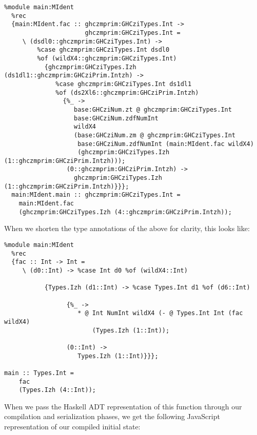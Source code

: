 \begin{verbatim}
%module main:MIdent
  %rec
  {main:MIdent.fac :: ghczmprim:GHCziTypes.Int ->
                      ghczmprim:GHCziTypes.Int =
     \ (dsdl0::ghczmprim:GHCziTypes.Int) ->
         %case ghczmprim:GHCziTypes.Int dsdl0
         %of (wildX4::ghczmprim:GHCziTypes.Int)
           {ghczmprim:GHCziTypes.Izh (ds1dl1::ghczmprim:GHCziPrim.Intzh) ->
              %case ghczmprim:GHCziTypes.Int ds1dl1
              %of (ds2Xl6::ghczmprim:GHCziPrim.Intzh)
                {%_ ->
                   base:GHCziNum.zt @ ghczmprim:GHCziTypes.Int 
                   base:GHCziNum.zdfNumInt
                   wildX4
                   (base:GHCziNum.zm @ ghczmprim:GHCziTypes.Int
                    base:GHCziNum.zdfNumInt (main:MIdent.fac wildX4)
                    (ghczmprim:GHCziTypes.Izh (1::ghczmprim:GHCziPrim.Intzh)));
                 (0::ghczmprim:GHCziPrim.Intzh) ->
                   ghczmprim:GHCziTypes.Izh (1::ghczmprim:GHCziPrim.Intzh)}}};
  main:MIdent.main :: ghczmprim:GHCziTypes.Int =
    main:MIdent.fac
    (ghczmprim:GHCziTypes.Izh (4::ghczmprim:GHCziPrim.Intzh));
\end{verbatim}

\noindent When we shorten the type annotations of the above for clarity,
this looks like:

\begin{verbatim}
%module main:MIdent
  %rec
  {fac :: Int -> Int =
     \ (d0::Int) -> %case Int d0 %of (wildX4::Int)

           {Types.Izh (d1::Int) -> %case Types.Int d1 %of (d6::Int)

                 {%_ ->
                    * @ Int NumInt wildX4 (- @ Types.Int Int (fac wildX4) 
                        (Types.Izh (1::Int));
                 
                 (0::Int) ->
                    Types.Izh (1::Int)}}};

main :: Types.Int =
    fac
    (Types.Izh (4::Int));
\end{verbatim}

\noindent When we pass the Haskell ADT representation of this function
through our compilation and serialization phases, we get the following 
JavaScript representation of our compiled initial state:

